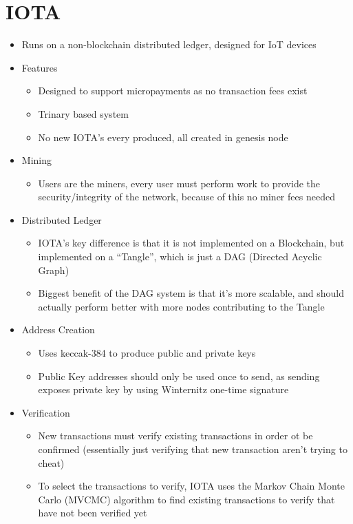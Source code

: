 \section{IOTA}
\begin{itemize}
	\item Runs on a non-blockchain distributed ledger, designed for IoT devices
	\item Features
	\begin{itemize}
		\item Designed to support micropayments as no transaction fees exist
		\item Trinary based system
		\item No new IOTA's every produced, all created in genesis node
	\end{itemize}
	\item Mining
	\begin{itemize}
		\item Users are the miners, every user must perform work to provide the security/integrity of the network, because of this no miner fees needed
	\end{itemize}
	\item Distributed Ledger
	\begin{itemize}
		\item IOTA's key difference is that it is not implemented on a Blockchain, but implemented on a ``Tangle'', which is just a DAG (Directed Acyclic Graph)
		\item Biggest benefit of the DAG system is that it's more scalable, and should actually perform better with more nodes contributing to the Tangle
	\end{itemize}
	\item Address Creation
	\begin{itemize}
		\item Uses keccak-384 to produce public and private keys
		\item Public Key addresses should only be used once to send, as sending exposes private key by using Winternitz one-time signature
	\end{itemize}
	\item Verification
	\begin{itemize}
		\item New transactions must verify existing transactions in order ot be confirmed (essentially just verifying that new transaction aren't trying to cheat)
		\item To select the transactions to verify, IOTA uses the Markov Chain Monte Carlo (MVCMC) algorithm to find existing transactions to verify that have not been verified yet

\end{itemize}
\end{itemize}
